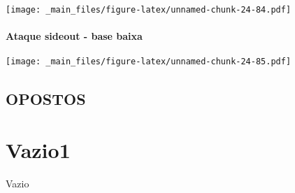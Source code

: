 \documentclass[
]{book}
\begin{document}
\texttt{[image: \_main\_files/figure-latex/unnamed-chunk-24-84.pdf]}

\subsubsection*{Ataque sideout - base baixa}\label{ataque-sideout---base-baixa-4}

\texttt{[image: \_main\_files/figure-latex/unnamed-chunk-24-85.pdf]} \newpage

\section{OPOSTOS}\label{opostos}

\chapter{Vazio1}\label{vazio1}

Vazio

  
\end{document}
